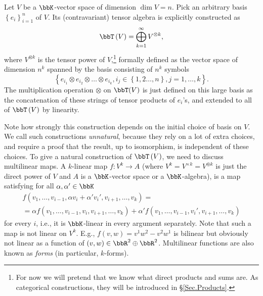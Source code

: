 \begin{example}\label{Tensor algebra}
Let $V$ be a $\bbK$-vector space of dimension $\dim V=n$. Pick an
arbitrary basis $\left\{ e_{i}\right\} _{i=1}^{n}$ of $V$. Its (contravariant)
tensor algebra is explicitly constructed as 
\begin{equation}
\bbT\left(V\right)=\bigoplus_{k=1}^{\infty}V^{\otimes k},\label{eq: tensor alg}
\end{equation}
where $V^{\otimes k}$ is the tensor power of $V$,\footnote{For now we will pretend that we know what direct products and sums are. As categorical constructions, they will be introduced in \S\ref{Sec.Products}.} formally defined
as the vector space of dimension $n^k$ spanned by the basis consisting
of $n^k$ symbols \[\left\{ e_{i_{1}}\otimes e_{i_{2}}\otimes\ldots\otimes e_{i_{k}},i_{j}\in\left\{ 1,2\ldots,n\right\} ,j=1,\ldots,k\right\}.\]
The multiplication operation $\otimes$ on $\bbT(V)$ is just defined
on this large basis as the concatenation of these strings of tensor products
of $e_{i}$'s, and extended to all of $\bbT\left(V\right)$ by linearity.

Note how strongly this construction depends on the initial choice
of basis on $V$. We call such constructions \emph{unnatural}, because
they rely on a lot of extra choices, and require a proof that the
result, up to isomorphism, is independent of these choices. To give
a natural construction of $\bbT\left(V\right)$, we need to discuss multilinear
maps. A $k$-linear map $f:V^{k}\to A$ (where $V^k=V^{\times k}=V^{\oplus k}$ is just the direct power of $V$ and $A$ is a $\bbK$-vector space or a $\bbK$-algebra),
is a map satisfying for all $\alpha,\alpha'\in \bbK$
\begin{multline}
    f\left(v_{1},\ldots,v_{i-1},\alpha v_{i}+\alpha'v_{i}',v_{i+1},\ldots,v_{k}\right)=\\=\alpha f\left(v_{1},\ldots,v_{i-1},v_{i},v_{i+1},\ldots,v_{k}\right)+\alpha'f\left(v_{1},\ldots,v_{i-1},v_{i}',v_{i+1},\ldots,v_{k}\right)
\end{multline}
for every $i$, i.e., it is $\bbK$-linear in every argument separately.
Note that such a map is not linear on $V^{k}$. E.g., $f\left(v,w\right)=v^1w^2-v^2w^1$ is bilinear but obviously not linear as a function of $(v,w)\in \bbR^{2}\oplus \bbR^2$. Multilinear functions are also known as \emph{forms} (in particular, $k$-forms).


\end{example}

